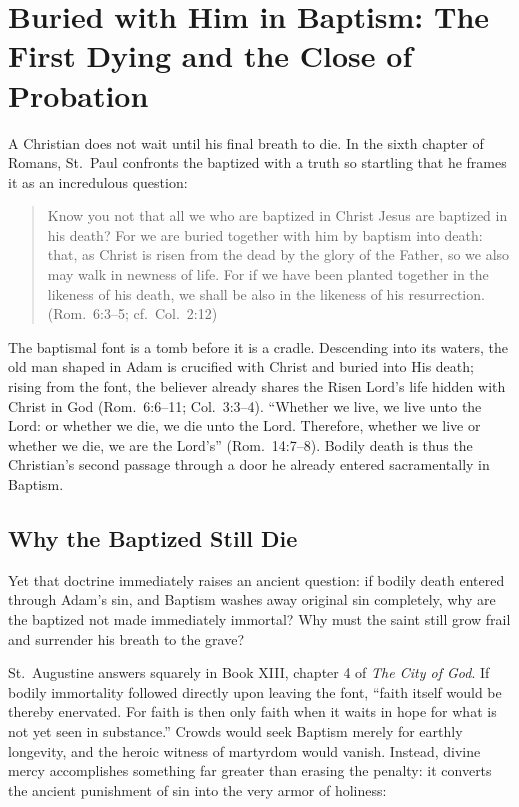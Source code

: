\section{Buried with Him in Baptism: The First Dying and the Close of Probation}

A Christian does not wait until his final breath to die. In the sixth chapter of Romans, St.~Paul confronts the baptized with a truth so startling that he frames it as an incredulous question:

\begin{quote}
Know you not that all we who are baptized in Christ Jesus are baptized in his death? For we are buried together with him by baptism into death: that, as Christ is risen from the dead by the glory of the Father, so we also may walk in newness of life. For if we have been planted together in the likeness of his death, we shall be also in the likeness of his resurrection. (Rom.\ 6:3--5; cf.\ Col.\ 2:12)
\end{quote}

The baptismal font is a tomb before it is a cradle. Descending into its waters, the old man shaped in Adam is crucified with Christ and buried into His death; rising from the font, the believer already shares the Risen Lord's life hidden with Christ in God (Rom.\ 6:6--11; Col.\ 3:3--4). ``Whether we live, we live unto the Lord: or whether we die, we die unto the Lord. Therefore, whether we live or whether we die, we are the Lord's'' (Rom.\ 14:7--8). Bodily death is thus the Christian's second passage through a door he already entered sacramentally in Baptism.

\subsection{Why the Baptized Still Die}

Yet that doctrine immediately raises an ancient question: if bodily death entered through Adam's sin, and Baptism washes away original sin completely, why are the baptized not made immediately immortal? Why must the saint still grow frail and surrender his breath to the grave?

St.~Augustine answers squarely in Book XIII, chapter 4 of \emph{The City of God}. If bodily immortality followed directly upon leaving the font, ``faith itself would be thereby enervated. For faith is then only faith when it waits in hope for what is not yet seen in substance.'' Crowds would seek Baptism merely for earthly longevity, and the heroic witness of martyrdom would vanish. Instead, divine mercy accomplishes something far greater than erasing the penalty: it converts the ancient punishment of sin into the very armor of holiness:

